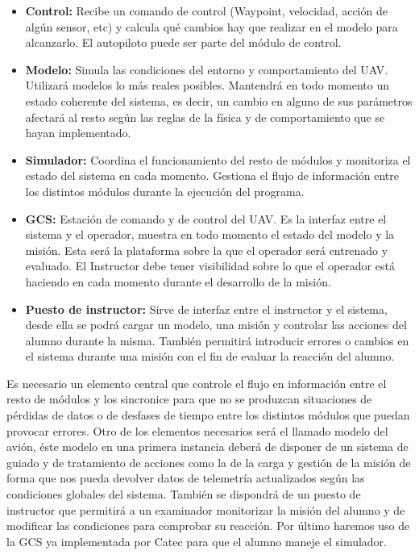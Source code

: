 \documentclass[12pt,a4paper,spanish]{book} %
\begin{document}
\begin{itemize}
\item\textbf{Control:} Recibe un comando de control (Waypoint, velocidad, acción de algún sensor, etc) y calcula qué cambios hay que realizar en el modelo para alcanzarlo. El autopiloto puede ser parte del módulo de control.

\item\textbf{Modelo:} Simula las condiciones del entorno y comportamiento del UAV. Utilizará modelos lo más reales posibles. Mantendrá en todo momento un estado coherente del sistema, es decir, un cambio en alguno de sus parámetros afectará al resto según las reglas de la física y de comportamiento que se hayan implementado.

\item\textbf{Simulador:} Coordina el funcionamiento del resto de módulos y monitoriza el estado del sistema en cada momento. Gestiona el flujo de información entre los distintos módulos durante la ejecución del programa.

\item\textbf{GCS:} Estación de comando y de control del UAV. Es la interfaz entre el sistema y el operador, muestra en todo momento el estado del modelo y la misión. Esta será la plataforma sobre la que el operador será entrenado y evaluado. El Instructor debe tener visibilidad sobre lo que el operador está haciendo en cada momento durante el desarrollo de la misión.

\item\textbf{Puesto de instructor:} Sirve de interfaz entre el instructor y el sistema, desde ella se podrá cargar un modelo, una misión y controlar las acciones del alumno durante la misma. También permitirá introducir errores o cambios en el sistema durante una misión con el fin de evaluar la reacción del alumno.

\end{itemize}

Es necesario un elemento central que controle el flujo en información entre el resto de módulos y los sincronice para que no se produzcan situaciones de pérdidas de datos o de desfases de tiempo entre los distintos módulos que puedan provocar errores. Otro de los elementos necesarios será el llamado modelo del avión, éste modelo en una primera instancia deberá de disponer de un sistema de guiado y de tratamiento de acciones como la de la carga y gestión de la misión de forma que nos pueda devolver datos de telemetría actualizados según las condiciones globales del sistema. También se dispondrá de un puesto de instructor que permitirá a un examinador monitorizar la misión del alumno y de modificar las condiciones para comprobar su reacción. Por último haremos uso de la GCS ya implementada por Catec para que el alumno maneje el simulador.
\end{document}
